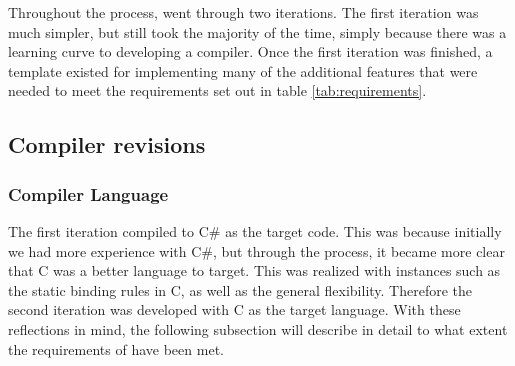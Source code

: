 \begin{table}[H]
\centering
{}
\caption{Language Criteria for PEAK+}
\label{tab:peaklanguageCriteria}
\end{table}

Throughout the process, \lang went through two iterations. The first iteration was much simpler, but still took the majority of the time, simply because there was a learning curve to developing a compiler. Once the first iteration was finished, a template existed for implementing many of the additional features that were needed to meet the requirements set out in table \ref{tab:requirements}.

\subsection{Compiler revisions} \label{Diss:CompilerRev}
\subsubsection{Compiler Language}
The first iteration compiled to C\# as the target code. This was because initially we had more experience with C\#, but through the process, it became more clear that C was a better language to target. This was realized with instances such as the static binding rules in C, as well as the general flexibility. Therefore the second iteration was developed with C as the target language. With these reflections in mind, the following subsection will describe in detail to what extent the requirements of \lang have been met. \\

